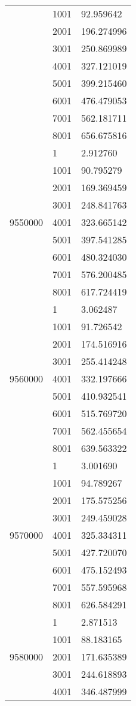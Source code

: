 \begin{table}[htb!]
\begin{tabular}{lll}
 & 1001 & 92.959642 \\
 & 2001 & 196.274996 \\
 & 3001 & 250.869989 \\
 & 4001 & 327.121019 \\
 & 5001 & 399.215460 \\
 & 6001 & 476.479053 \\
 & 7001 & 562.181711 \\
 & 8001 & 656.675816 \\
\multirow[c]{9}{*}{9550000} & 1 & 2.912760 \\
 & 1001 & 90.795279 \\
 & 2001 & 169.369459 \\
 & 3001 & 248.841763 \\
 & 4001 & 323.665142 \\
 & 5001 & 397.541285 \\
 & 6001 & 480.324030 \\
 & 7001 & 576.200485 \\
 & 8001 & 617.724419 \\
\multirow[c]{9}{*}{9560000} & 1 & 3.062487 \\
 & 1001 & 91.726542 \\
 & 2001 & 174.516916 \\
 & 3001 & 255.414248 \\
 & 4001 & 332.197666 \\
 & 5001 & 410.932541 \\
 & 6001 & 515.769720 \\
 & 7001 & 562.455654 \\
 & 8001 & 639.563322 \\
\multirow[c]{9}{*}{9570000} & 1 & 3.001690 \\
 & 1001 & 94.789267 \\
 & 2001 & 175.575256 \\
 & 3001 & 249.459028 \\
 & 4001 & 325.334311 \\
 & 5001 & 427.720070 \\
 & 6001 & 475.152493 \\
 & 7001 & 557.595968 \\
 & 8001 & 626.584291 \\
\multirow[c]{9}{*}{9580000} & 1 & 2.871513 \\
 & 1001 & 88.183165 \\
 & 2001 & 171.635389 \\
 & 3001 & 244.618893 \\
 & 4001 & 346.487999 \\

\end{tabular}
\end{table}
